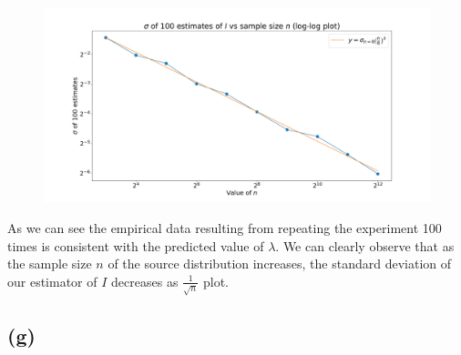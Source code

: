 \documentclass[12pt]{article}
\begin{document}
\begin{figure}[H]
  \begin{center}
    \hspace*{-1cm}
    \includegraphics[scale=0.4]{plot2.png}
  \end{center}
\end{figure}
\vspace{-0.75cm}
As we can see the empirical data resulting from repeating the experiment 100 times 
is consistent with the predicted value of $\lambda$. We can clearly observe that as the 
sample size $n$ of the source distribution increases, the standard deviation of our estimator of $ I $ decreases as $ \frac{1}{\sqrt{n}} $ plot.

\subsection*{(g)}
\end{document}
